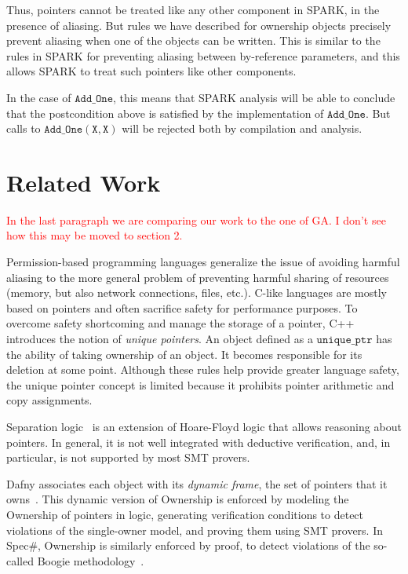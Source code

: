 \documentclass{llncs}
\newcommand\maroua[1]{\textcolor{red}{#1}}
\newcommand\var[1]{\ensuremath{\mathtt{#1}}}
\begin{document}
Thus, pointers cannot be treated like any other component in SPARK, in the presence of aliasing. But rules we have described for ownership objects precisely prevent
aliasing when one of the objects can be written. This is similar to the rules in SPARK for preventing aliasing between by-reference parameters, and this allows SPARK to treat such pointers
like other components.

In the case of \var{Add\_One}, this means that SPARK analysis will be able to conclude that the postcondition above is satisfied by the implementation of \var{Add\_One}.
But calls to \var{Add\_One(X,X)} will be rejected both by compilation and analysis.


\section{Related Work}

\maroua{In the last paragraph we are comparing our work to the one of GA. I don't see how this may be moved to section 2.}

Permission-based programming languages generalize the issue of avoiding harmful aliasing to the more general problem of preventing harmful sharing of resources
(memory, but also network connections, files, etc.). C-like languages are mostly based on pointers and often sacrifice safety for performance purposes.
To overcome safety shortcoming and manage the storage of a pointer, C++ introduces the notion of \textit{unique pointers}. An object defined as a \var{unique\_ptr}
has the ability of taking ownership of an object. It becomes responsible for its deletion at some point. Although these rules help provide greater language safety, the unique
pointer concept is limited because it prohibits pointer arithmetic and copy assignments.
 
Separation logic~\cite{Reynolds02} is an extension of Hoare-Floyd logic that allows reasoning about pointers. In general, it is not well integrated with deductive
verification, and, in particular, is not supported by most SMT provers.


Dafny associates each object with its \emph{dynamic frame}, the set of pointers that it owns~\cite{Leino10}. This dynamic version of Ownership is
enforced by modeling the Ownership of pointers in logic, generating verification conditions to detect violations of the single-owner model, and proving
them using SMT provers. In Spec\#, Ownership is similarly enforced by proof, to detect violations of the so-called Boogie methodology~\cite{Boogie}.
\end{document}

